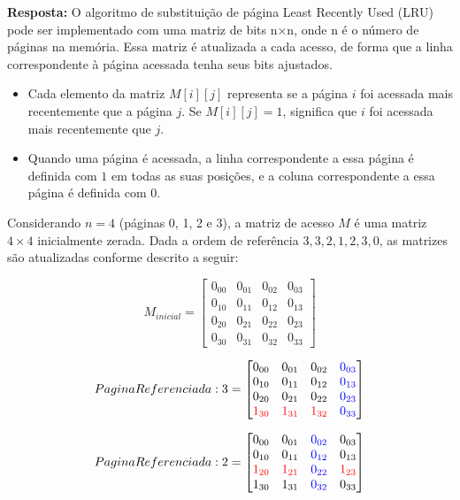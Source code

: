 \documentclass{article}
\begin{document}
\textbf{Resposta: }O algoritmo de substituição de página Least Recently Used (LRU) pode ser implementado com uma matriz de bits n×n, onde n é o número de páginas na memória. Essa matriz é atualizada a cada acesso, de forma que a linha correspondente à página acessada tenha seus bits ajustados.

\begin{itemize}
    \item Cada elemento da matriz $M[i][j]$ representa se a página $i$ foi acessada mais recentemente que a página $j$. Se $M[i][j]=1$, significa que $i$ foi acessada mais recentemente que $j$.
    \item Quando uma página é acessada, a linha correspondente a essa página é definida com $1$ em todas as suas posições, e a coluna correspondente a essa página é definida com $0$.
\end{itemize}

Considerando $n=4$ (páginas 0, 1, 2 e 3), a matriz de acesso $M$ é uma matriz $4 \times 4$ inicialmente zerada. Dada a ordem de referência $3, 3, 2, 1, 2, 3, 0$, as matrizes são atualizadas conforme descrito a seguir:


\[M_{inicial} =
\begin{bmatrix}
  0_{00} & 0_{01} & 0_{02} & 0_{03}\\
  0_{10} & 0_{11} & 0_{12}    & 0_{13}\\
  0_{20} & 0_{21} & 0_{22}    & 0_{23}\\
  0_{30} & 0_{31} & 0_{32}    & 0_{33}
\end{bmatrix}
\]

\[PaginaReferenciada: 3 =
\begin{bmatrix}
  0_{00} & 0_{01} & 0_{02} & \textcolor{blue}{0_{03}}\\
  0_{10} & 0_{11} & 0_{12}    & \textcolor{blue}{0_{13}}\\
  0_{20} & 0_{21} & 0_{22}    & \textcolor{blue}{0_{23}}\\
  \textcolor{red}{1_{30}} & \textcolor{red}{1_{31}} & \textcolor{red}{1_{32}}    & \textcolor{blue}{0_{33}}
\end{bmatrix}
\]

\[
PaginaReferenciada: 2 =
\begin{bmatrix}
  0_{00} & 0_{01} & \textcolor{blue}{0_{02}} & 0_{03} \\
  0_{10} & 0_{11} & \textcolor{blue}{0_{12}} & 0_{13} \\
  \textcolor{red}{1_{20}} & \textcolor{red}{1_{21}} & \textcolor{blue}{0_{22}} & \textcolor{red}{1_{23}} \\
  1_{30} & 1_{31} & \textcolor{blue}{0_{32}} & 0_{33}
\end{bmatrix}
\]
\end{document}

